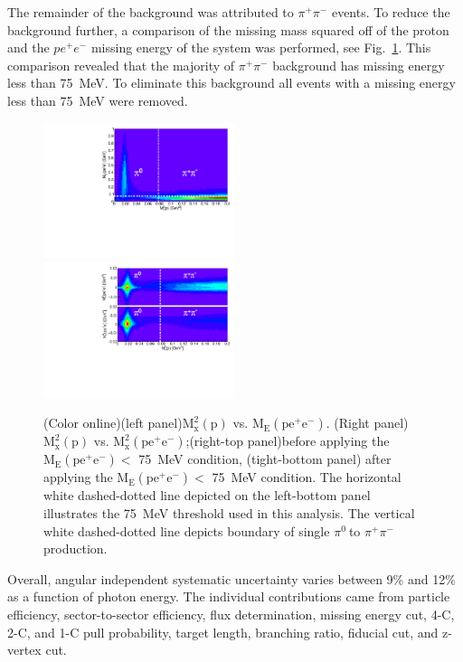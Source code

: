 \documentclass[aps,prc,twocolumn,floatfix,showpacs,preprintnumbers,amsmath,amssymb,superscriptaddress]{revtex4-1}
\def\pizT{$\pi^{0} \ $}
\begin{document}
The remainder of the background was attributed to $\pi^+\pi^-$
events. To reduce the background further, a comparison of the missing mass squared off of the proton and the $pe^+e^-$ missing energy of the system was 
performed, see Fig.~\ref{fig:sys}. This comparison revealed that the majority of
$\pi^+\pi^-$ background has missing energy less than 75~MeV. 
To eliminate this background all events with a missing energy 
less than 75~MeV were removed.

\begin{figure}[htb!]
	\centerline{
		\includegraphics[height=0.4\textwidth,width=0.5\textwidth]{ME_vs_mxpcompare.pdf} \label{fig:beforecut}\hfill
		\includegraphics[height=0.4\textwidth,width=0.5\textwidth]{mm2_vs_mxp_compare.pdf}
		\label{fig:aftercut}}	
	\caption{(Color online)(left panel)$\mathrm{M_x^2(p)}$ vs. $\mathrm{M_E(pe^+e^-)}$. (Right panel)$\mathrm{M_x^2(p)}$ vs. $\mathrm{M_x^2(pe^+e^-)}$;(right-top panel)before applying the $\mathrm{M_E(pe^+e^-)} <$ 75~MeV condition, (tight-bottom panel) after applying the $\mathrm{M_E(pe^+e^-)} <$ 75~MeV condition. The horizontal white dashed-dotted line depicted on the left-bottom panel illustrates the 75~MeV threshold used in this analysis. The vertical white dashed-dotted line depicts boundary of single \pizT to $\pi^+\pi^-$  production.	
	}\label{fig:sys}		
\end{figure}

Overall, angular independent systematic uncertainty varies 
between 9\% and 12\% as a function of photon energy. The 
individual contributions came from particle efficiency, 
sector-to-sector efficiency, flux determination, missing energy cut, 
4-C, 2-C, and 1-C pull probability, target length, branching 
ratio, fiducial cut, and z-vertex cut.
\end{document}
